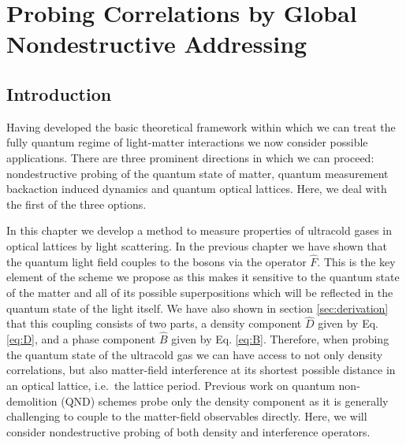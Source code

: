 
\chapter{Probing Correlations by Global 
Nondestructive Addressing} %

\ifpdf
    \graphicspath{{Chapter3/Figs/Raster/}{Chapter3/Figs/PDF/}{Chapter3/Figs/}}
\else
    \graphicspath{{Chapter3/Figs/Vector/}{Chapter3/Figs/}}
\fi



\section{Introduction}

Having developed the basic theoretical framework within which we can
treat the fully quantum regime of light-matter interactions we now
consider possible applications. There are three prominent directions
in which we can proceed: nondestructive probing of the quantum state
of matter, quantum measurement backaction induced dynamics and quantum
optical lattices. Here, we deal with the first of the three options.

In this chapter we develop a method to measure properties of ultracold
gases in optical lattices by light scattering. In the previous chapter
we have shown that the quantum light field couples to the bosons via
the operator $\hat{F}$. This is the key element of the scheme we
propose as this makes it sensitive to the quantum state of the matter
and all of its possible superpositions which will be reflected in the
quantum state of the light itself. We have also shown in section
\ref{sec:derivation} that this coupling consists of two parts, a
density component $\hat{D}$ given by Eq. \eqref{eq:D}, and a phase
component $\hat{B}$ given by Eq. \eqref{eq:B}. Therefore, when probing
the quantum state of the ultracold gas we can have access to not only
density correlations, but also matter-field interference at its
shortest possible distance in an optical lattice, i.e.~the lattice
period. Previous work on quantum non-demolition (QND) schemes
\cite{rogers2014, mekhov2007prl, eckert2008} probe only the density
component as it is generally challenging to couple to the matter-field
observables directly. Here, we will consider nondestructive probing of
both density and interference operators.

